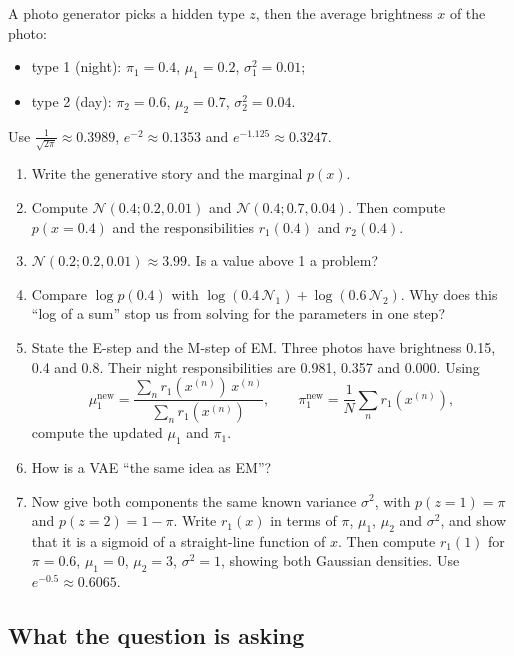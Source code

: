 \documentclass[12pt,a4paper]{article}
\begin{document}
A photo generator picks a hidden type $z$, then the average brightness $x$ of the photo:
\begin{itemize}[nosep]
  \item type 1 (night): $\pi_1=0.4$, $\mu_1=0.2$, $\sigma_1^2=0.01$;
  \item type 2 (day): $\pi_2=0.6$, $\mu_2=0.7$, $\sigma_2^2=0.04$.
\end{itemize}
Use $\frac{1}{\sqrt{2\pi}}\approx0.3989$, $e^{-2}\approx0.1353$ and $e^{-1.125}\approx0.3247$.
\begin{enumerate}[label=(\alph*)]
  \item Write the generative story and the marginal $p(x)$.
  \item[\colorbox{yellow}{(b)}] Compute $\mathcal{N}(0.4;0.2,0.01)$ and $\mathcal{N}(0.4;0.7,0.04)$. Then compute $p(x=0.4)$ and the responsibilities $r_1(0.4)$ and $r_2(0.4)$.
  \item[\colorbox{yellow}{(c)}] $\mathcal{N}(0.2;0.2,0.01)\approx3.99$. Is a value above 1 a problem?
  \item[\colorbox{yellow}{(d)}] Compare $\log p(0.4)$ with $\log(0.4\,\mathcal{N}_1)+\log(0.6\,\mathcal{N}_2)$. Why does this ``log of a sum'' stop us from solving for the parameters in one step?
  \item[\colorbox{yellow}{(e)}] State the E-step and the M-step of EM. Three photos have brightness 0.15, 0.4 and 0.8. Their night responsibilities are 0.981, 0.357 and 0.000. Using
  \[
  \mu_1^{\text{new}}=\frac{\sum_n r_1(x^{(n)})\,x^{(n)}}{\sum_n r_1(x^{(n)})},\qquad \pi_1^{\text{new}}=\frac{1}{N}\sum_n r_1(x^{(n)}),
  \]
  compute the updated $\mu_1$ and $\pi_1$.
  \item[\colorbox{yellow}{(f)}] How is a VAE ``the same idea as EM''?
  \item[\colorbox{yellow}{(g)}] Now give both components the same known variance $\sigma^2$, with $p(z=1)=\pi$ and $p(z=2)=1-\pi$. Write $r_1(x)$ in terms of $\pi$, $\mu_1$, $\mu_2$ and $\sigma^2$, and show that it is a sigmoid of a straight-line function of $x$. Then compute $r_1(1)$ for $\pi=0.6$, $\mu_1=0$, $\mu_2=3$, $\sigma^2=1$, showing both Gaussian densities. Use $e^{-0.5}\approx0.6065$.
\end{enumerate}

\subsection{What the question is asking}
\end{document}
